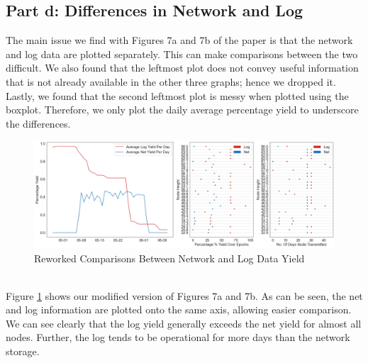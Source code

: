 \documentclass[11pt, letterpaper]{article}
\begin{document}
\subsection{Part d: Differences in Network and Log}
The main issue we find with Figures 7a and 7b of the paper is that the network and log data are plotted separately. This can make comparisons between the two difficult. We also found that the leftmost plot does not convey useful information that is not already available in the other three graphs; hence we dropped it.  Lastly, we found that the second leftmost plot is messy when plotted using the boxplot. Therefore, we only plot the daily average percentage yield to underscore the differences. 
\\
\begin{figure}[h!]
\centering
\captionsetup{justification=centering}
\includegraphics[width=1\textwidth]{Report Images/graph_critique_d.png}
\caption{Reworked Comparisons Between Network and Log Data Yield}
\label{fig:graph_crtique_d}
\end{figure}
\\

Figure \ref{fig:graph_crtique_d} shows our modified version of Figures 7a and 7b. As can be seen, the net and log information are plotted onto the same axis, allowing easier comparison. We can see clearly that the log yield generally exceeds the net yield for almost all nodes. Further, the log tends to be operational for more days than the network storage. 

\pagebreak
\end{document}

